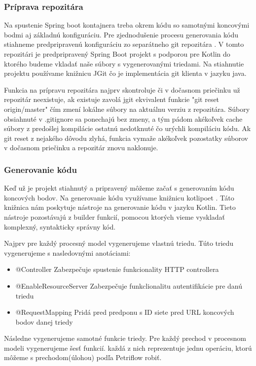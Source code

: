 \subsubsection{Príprava repozitára} 
Na spustenie Spring boot kontajnera treba okrem kódu so samotnými koncovými bodmi aj základnú konfiguráciu. Pre zjednodušenie procesu generovania kódu stiahneme predpripravenú konfiguráciu zo separátneho git repozitára \cite{dp_relay}. V tomto repozitári je predpripravený Spring Boot projekt s podporou pre Kotlin do ktorého budeme vkladať naše súbory s vygenerovanými triedami. Na stiahnutie projektu používame knižnicu JGit \cite{jgit} čo je implementácia git klienta v jazyku java. 


Funkcia na prípravu repozitára najprv skontroluje či v dočasnom priečinku už repozitár neexistuje, ak existuje zavolá jgit ekvivalent funkcie "git reset origin/master" čím zmení lokálne súbory na aktuálnu verziu z repozitára. Súbory obsiahnuté v .gitignore sa ponechajú bez zmeny, a tým pádom akékoľvek cache súbory z predošlej kompilácie ostatnú nedotknuté čo urýchli kompiláciu kódu. Ak git reset z nejakého dôvodu zlyhá, funkcia vymaže akékoľvek pozostatky súborov v dočasnom priečinku a repozitár znovu naklonuje. 


\subsubsection{Generovanie kódu} 
Keď už je projekt stiahnutý a pripravený môžeme začať s generovaním kódu koncových bodov. Na generovanie kódu  využívame knižnicu kotlipoet \cite{kotlipoet}. Táto knižnica nám poskytuje nástroje na generovanie kódu v jazyku Kotlin. Tieto nástroje pozostávajú z builder funkcií, pomocou ktorých vieme vyskladať komplexný, syntakticky správny kód. 

Najprv pre každý procesný model vygenerujeme vlastnú triedu. Túto triedu vygenerujeme s nasledovnými anotáciami: 

\begin{itemize} 
	\item @Controller Zabezpečuje spustenie funkcionality HTTP controllera  
	\item @EnableResourceServer Zabezpečuje funkclionalitu autentifikácie pre danú triedu 
	\item @RequestMapping Pridá pred predponu s ID siete pred URL koncových bodov danej triedy 
\end{itemize} 

Následne vygenerujeme samotné funkcie triedy. Pre každý prechod v procesnom modeli vygenerujeme šesť funkcií. každá z nich reprezentuje jednu operáciu, ktorú môžeme s prechodom(úlohou) podľa Petriflow robiť.  

